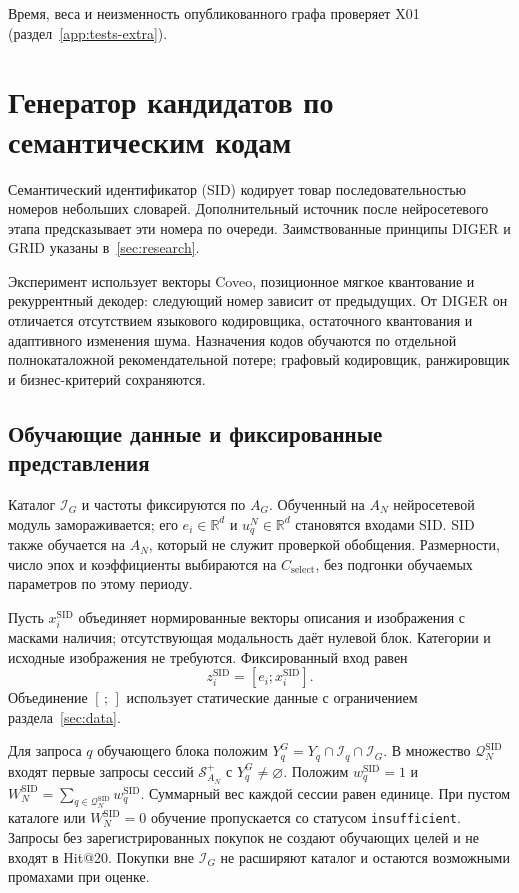 \documentclass[12pt,a4paper]{article}
\newcommand{\code}[1]{{\ttfamily\small\nolinkurl{#1}}}
\newcommand{\R}{\mathbb R}
\theoremstyle{plainru}
\begin{document}
Время, веса и неизменность опубликованного графа проверяет X01
(раздел~\ref{app:tests-extra}).

\section{Генератор кандидатов по семантическим кодам}
\label{sec:sid-overview}

Семантический идентификатор (SID) кодирует товар последовательностью
номеров небольших словарей. Дополнительный источник после нейросетевого
этапа предсказывает эти номера по очереди.
Заимствованные принципы DIGER и GRID указаны в~\ref{sec:research}.

Эксперимент использует векторы Coveo, позиционное мягкое квантование
и рекуррентный декодер: следующий номер зависит от предыдущих.
От DIGER он отличается отсутствием языкового кодировщика, остаточного
квантования и адаптивного изменения шума. Назначения кодов обучаются
по отдельной полнокаталожной рекомендательной потере; графовый
кодировщик, ранжировщик и бизнес-критерий сохраняются.

\subsection{Обучающие данные и фиксированные представления}
\label{sec:sid-data}

Каталог $\mathcal I_G$ и частоты фиксируются по $A_G$.
Обученный на $A_N$ нейросетевой модуль замораживается;
его $e_i\in\R^d$ и $u_q^N\in\R^d$ становятся входами SID.
SID также обучается на $A_N$, который не служит проверкой обобщения.
Размерности, число эпох и коэффициенты выбираются на $C_{\mathrm{select}}$,
без подгонки обучаемых параметров по этому периоду.

Пусть $x_i^{\mathrm{SID}}$ объединяет нормированные векторы описания
и изображения с масками наличия; отсутствующая модальность даёт
нулевой блок. Категории и исходные изображения не требуются.
Фиксированный вход равен
\begin{equation}\label{eq:sid-fixed-input}
 z_i^{\mathrm{SID}}=[e_i;x_i^{\mathrm{SID}}].
\end{equation}
Объединение $[\,;\,]$ использует статические данные
с ограничением раздела~\ref{sec:data}.

Для запроса $q$ обучающего блока положим
$Y_q^G=Y_q\cap\mathcal I_q\cap\mathcal I_G$.
В множество $\mathcal Q_N^{\mathrm{SID}}$ входят первые запросы сессий
$\mathcal S_{A_N}^{+}$ с $Y_q^G\ne\varnothing$. Положим
$w_q^{\mathrm{SID}}=1$ и
$W_N^{\mathrm{SID}}=\sum_{q\in\mathcal Q_N^{\mathrm{SID}}}w_q^{\mathrm{SID}}$.
Суммарный вес каждой сессии равен единице. При пустом каталоге
или $W_N^{\mathrm{SID}}=0$ обучение пропускается со статусом
\code{insufficient}. Запросы без зарегистрированных покупок не создают
обучающих целей и не входят в Hit@20. Покупки вне $\mathcal I_G$
не расширяют каталог и остаются возможными промахами при оценке.
\end{document}
